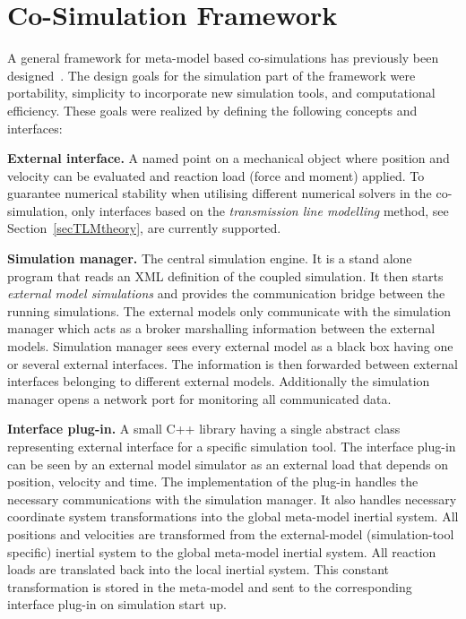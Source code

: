 \chapter{Co-Simulation Framework}
\label{framework}
A general framework for meta-model based co-simulations has previously
been designed~\cite{Siemers+Nakhimovski+Fritzson-05}. The design goals
for the simulation part of the framework were portability, simplicity
to incorporate new simulation tools, and computational efficiency.
These goals were realized by defining the following concepts and
interfaces:

\textbf{External interface.} A named point on a mechanical object
where position and velocity can be evaluated and reaction load (force
and moment) applied. To guarantee numerical stability when utilising
different numerical solvers in the co-simulation, only interfaces based
on the {\em transmission line modelling} method, see Section~\ref{secTLMtheory}, are
currently supported.

\textbf{Simulation manager.} The central simulation engine. It is a stand alone
program that reads an XML definition of the coupled simulation.  It
then starts \emph{external model simulations} and provides the
communication bridge between the running simulations. The external
models only communicate with the simulation manager which acts as a
broker marshalling information between the external models. Simulation
manager sees every external model as a black box having one or several
external interfaces. The information is then forwarded between
external interfaces belonging to different external
models. Additionally the simulation manager opens a network port for
monitoring all communicated data.

\textbf{Interface plug-in.} A small C++ library having a single
abstract class representing external interface for a specific
simulation tool. The interface plug-in can be seen by an external
model simulator as an external load that depends on position, velocity
and time. The implementation of the plug-in handles the necessary
communications with the simulation manager. It also handles necessary
coordinate system transformations into the global meta-model inertial
system. All positions and velocities are transformed from the
external-model (simulation-tool specific) inertial system to the
global meta-model inertial system. All reaction loads are translated
back into the local inertial system. This constant transformation is
stored in the meta-model and sent to the corresponding interface
plug-in on simulation start up.

